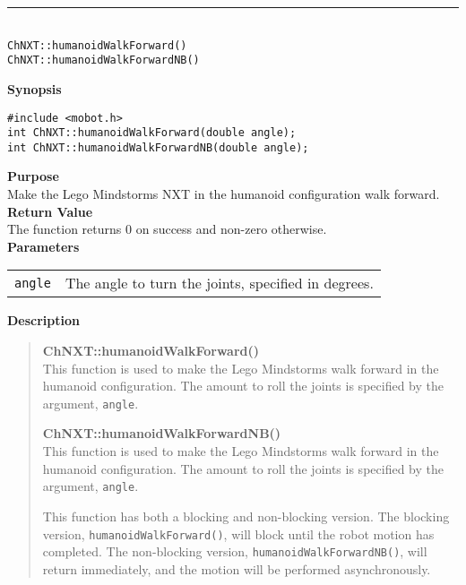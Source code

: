 \noindent
\vspace{5pt}
\rule{4.5in}{0.015in}\\
\noindent
{\LARGE \texttt{ChNXT::humanoidWalkForward()}}\\
{\LARGE \texttt{ChNXT::humanoidWalkForwardNB()}}\\
{}

\noindent
{\bf Synopsis}
\begin{lstlisting}
#include <mobot.h>
int ChNXT::humanoidWalkForward(double angle);
int ChNXT::humanoidWalkForwardNB(double angle);
\end{lstlisting}

\noindent
{\bf Purpose}\\
Make the Lego Mindstorms NXT in the humanoid configuration walk forward.\\

\noindent
{\bf Return Value}\\
The function returns 0 on success and non-zero otherwise.\\

\noindent
{\bf Parameters}\\
\vspace{-0.1in}
\begin{description}
\item               
\begin{tabular}{p{15 mm}p{145 mm}}
\texttt{angle} & The angle to turn the joints, specified in degrees.\\
\end{tabular}
\end{description}

\noindent
{\bf Description}\\
\vspace{-12pt}
\begin{quote}
{\bf ChNXT::humanoidWalkForward()}\\
This function is used to make the Lego Mindstorms walk forward in the humanoid
configuration. The amount to roll the joints is specified by the argument,
\texttt{angle}.

{\bf ChNXT::humanoidWalkForwardNB()}\\
This function is used to make the Lego Mindstorms walk forward in the humanoid
configuration. The amount to roll the joints is specified by the argument,
\texttt{angle}.

This function has both a blocking and non-blocking version.
The blocking version, \texttt{humanoidWalkForward()}, will block until the
robot motion has completed. The non-blocking version, \texttt{humanoidWalkForwardNB()},
will return immediately, and the motion will be performed asynchronously.\\
\end{quote}

